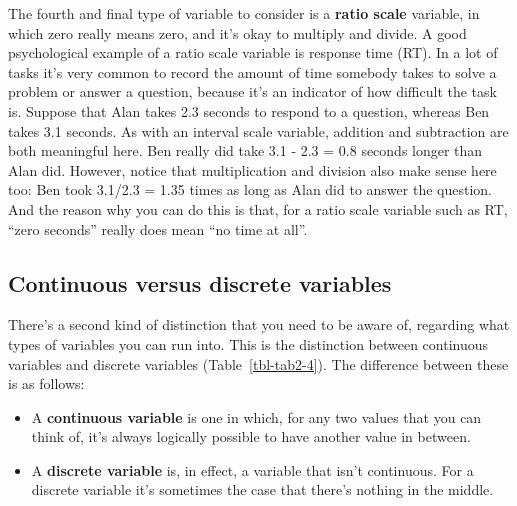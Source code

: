 \documentclass[
  a4paper,
]{book}
\providecommand{\tightlist}{%
  \setlength{\itemsep}{0pt}\setlength{\parskip}{0pt}}\usepackage{longtable,booktabs,array}
\begin{document}
The fourth and final type of variable to consider is a \textbf{ratio
scale} variable, in which zero really means zero, and it's okay to
multiply and divide. A good psychological example of a ratio scale
variable is response time (RT). In a lot of tasks it's very common to
record the amount of time somebody takes to solve a problem or answer a
question, because it's an indicator of how difficult the task is.
Suppose that Alan takes 2.3 seconds to respond to a question, whereas
Ben takes 3.1 seconds. As with an interval scale variable, addition and
subtraction are both meaningful here. Ben really did take 3.1 - 2.3 =
0.8 seconds longer than Alan did. However, notice that multiplication
and division also make sense here too: Ben took 3.1/2.3 = 1.35 times as
long as Alan did to answer the question. And the reason why you can do
this is that, for a ratio scale variable such as RT, ``zero seconds''
really does mean ``no time at all''.

\hypertarget{continuous-versus-discrete-variables}{%
\subsection{Continuous versus discrete
variables}\label{continuous-versus-discrete-variables}}

There's a second kind of distinction that you need to be aware of,
regarding what types of variables you can run into. This is the
distinction between continuous variables and discrete variables
(Table~\ref{tbl-tab2-4}). The difference between these is as follows:

\begin{itemize}
\tightlist
\item
  A \textbf{continuous variable} is one in which, for any two values
  that you can think of, it's always logically possible to have another
  value in between.
\item
  A \textbf{discrete variable} is, in effect, a variable that isn't
  continuous. For a discrete variable it's sometimes the case that
  there's nothing in the middle.
\end{itemize}

\hypertarget{tbl-tab2-4}{}
 
  \providecommand{\huxb}[2]{\arrayrulecolor[RGB]{#1}\global\arrayrulewidth=#2pt}
  \providecommand{\huxvb}[2]{\color[RGB]{#1}\vrule width #2pt}
  \providecommand{\huxtpad}[1]{\rule{0pt}{#1}}
  \providecommand{\huxbpad}[1]{\rule[-#1]{0pt}{#1}}
\end{document}
